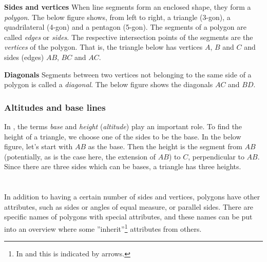 \begin{comment}
\reg[Samsvarande vinklar]{
	Vinkler med eit høgre eller venstre vinkelbein felles, kallast \textit{samsvarende vinkler}. I figuren under er dei markerte vinklane samsvarande fordi alle tre har den raude linja som venstre vinkelbein.
\fig{vink4}
	Vinklar med parvis parallelle høgre og venstre vinkelbein er like store.
\fig{vink4b}
}
\end{comment}
\newpage
\textbf{Sides and vertices} \os
When line segments form an enclosed shape, they form a \textit{polygon}. The below figure shows, from left to right, a triangle (3-gon), a quadrilateral (4-gon) and a pentagon (5-gon).
The segments of a polygon are called \textit{edges} or \textit{sides}. The respective intersection points of the segments are the \textit{vertices} of the polygon. That is, the triangle below has vertices $ A $, $ B $ and $ C $ and sides (edges) $ AB $, $ BC $ and $ AC $.
 \vsk

\textbf{Diagonals} \os
Segments between two vertices not belonging to the same side of a polygon is called a \textit{diagonal}. The below figure shows the diagonals $ AC $ and $ BD $.
\newpage
\subsubsection{Altitudes and base lines}
In , the terms \textit{base} and \textit{height} (\textit{altitude}) play an important role. To find the height of a triangle, we choose one of the sides to be the base. In the below figure, let's start with $ AB $ as the base. Then the height is the segment from $ AB $  (potentially, as is the case here, the extension of $ AB $) to $ C $, perpendicular to $ AB $.
Since there are three sides which can be bases, a triangle has three heights.
\section{\eignsk}
In addition to having a certain number of sides and vertices, polygons have other attributes, such as sides or angles of equal measure, or parallel sides. There are specific names of polygons with special attributes, and these names can be put into an overview where some ''inherit''\footnote{In  and  this is indicated by arrows.} attributes from others.\regv


